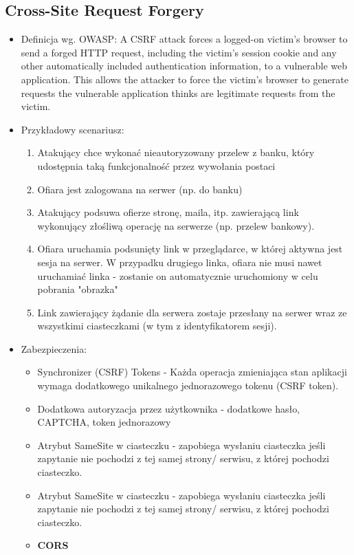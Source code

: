 \documentclass[../main.tex]{subfiles}
\begin{document}
    \subsection{Cross-Site Request Forgery}
    \begin{itemize}
        \item Definicja wg. OWASP: A CSRF attack forces a logged-on victim's browser to send a
        forged HTTP request, including the victim's session cookie and
        any other automatically included authentication information, to a
        vulnerable web application. This allows the attacker to force the
        victim's browser to generate requests the vulnerable application
        thinks are legitimate requests from the victim.
        \item Przykładowy scenariusz:
        \begin{enumerate}
            \item Atakujący chce wykonać nieautoryzowany przelew z banku, który udostępnia
            taką funkcjonalność przez wywołania postaci
            \item Ofiara jest zalogowana na serwer (np. do banku)
            \item Atakujący podsuwa ofierze stronę, maila, itp. zawierającą link wykonujący
            złośliwą operację na serwerze (np. przelew bankowy).
            \item Ofiara uruchamia podsunięty link w przeglądarce, w której aktywna jest sesja
            na serwer. W przypadku drugiego linka, ofiara nie musi nawet uruchamiać
            linka - zostanie on automatycznie uruchomiony w celu pobrania "obrazka"
            \item Link zawierający żądanie dla serwera zostaje przesłany na serwer wraz ze
            wszystkimi ciasteczkami (w tym z identyfikatorem sesji).
        \end{enumerate}
        \item Zabezpieczenia:
        \begin{itemize}
            \item Synchronizer (CSRF) Tokens - Każda operacja zmieniająca stan aplikacji wymaga dodatkowego unikalnego jednorazowego tokenu (CSRF token).
            \item Dodatkowa autoryzacja przez użytkownika - dodatkowe hasło, CAPTCHA, token jednorazowy
            \item Atrybut SameSite w ciasteczku - zapobiega wysłaniu ciasteczka jeśli zapytanie nie pochodzi z tej samej strony/
            serwisu, z której pochodzi ciasteczko.
            \item Atrybut SameSite w ciasteczku - zapobiega wysłaniu ciasteczka jeśli zapytanie nie pochodzi z tej samej strony/
            serwisu, z której pochodzi ciasteczko.
            \item \textbf{CORS}
        \end{itemize}
    \end{itemize}
\end{document}
